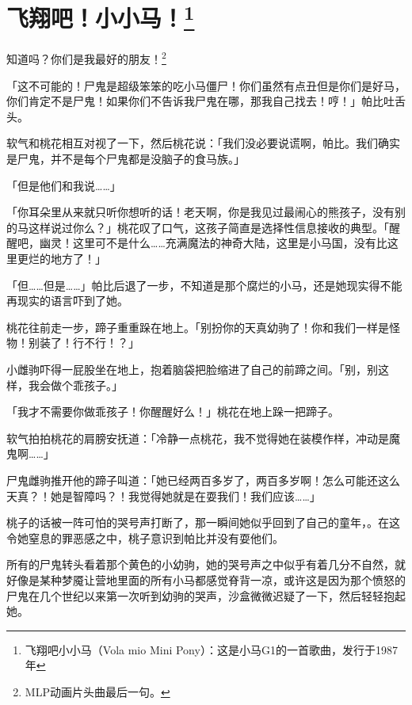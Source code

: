 \chapter[飞翔吧！小小马！]{\texorpdfstring{飞翔吧！小小马！\footnotespacefix\footnote{飞翔吧小小马（Vola mio Mini Pony）：这是小马G1的一首歌曲，发行于1987年}}{飞翔吧！小小马！}}



\begin{intro}
知道吗？你们是我最好的朋友！\footnotespacefix\footnote{MLP动画片头曲最后一句。}
\end{intro}


「这不可能的！尸鬼是超级笨笨的吃小马僵尸！你们虽然有点丑但是你们是好马，你们肯定不是尸鬼！如果你们不告诉我尸鬼在哪，那我自己找去！哼！」帕比吐舌头。

软气和桃花相互对视了一下，然后桃花说：「我们没必要说谎啊，帕比。我们确实是尸鬼，并不是每个尸鬼都是没脑子的食马族。」

「但是他们和我说……」

「你耳朵里从来就只听你想听的话！老天啊，你是我见过最闹心的熊孩子，没有别的马这样说过你么？」桃花叹了口气，这孩子简直是选择性信息接收的典型。「醒醒吧，幽灵！这里可不是什么……充满魔法的神奇大陆，这里是小马国，没有比这里更烂的地方了！」

「但……但是……」帕比后退了一步，不知道是那个腐烂的小马，还是她现实得不能再现实的语言吓到了她。

桃花往前走一步，蹄子重重跺在地上。「别扮你的天真幼驹了！你和我们一样是怪物！别装了！行不行！？」

小雌驹吓得一屁股坐在地上，抱着脑袋把脸缩进了自己的前蹄之间。「别，别这样，我会做个乖孩子。」

「我才不需要你做乖孩子！你醒醒好么！」桃花在地上跺一把蹄子。

软气拍拍桃花的肩膀安抚道：「冷静一点桃花，我不觉得她在装模作样，冲动是魔鬼啊……」

尸鬼雌驹推开他的蹄子叫道：「她已经两百多岁了，两百多岁啊！怎么可能还这么天真？！她是智障吗？！我觉得她就是在耍我们！我们应该……」

桃子的话被一阵可怕的哭号声打断了，那一瞬间她似乎回到了自己的童年，。在这令她窒息的罪恶感之中，桃子意识到帕比并没有耍他们。

所有的尸鬼转头看着那个黄色的小幼驹，她的哭号声之中似乎有着几分不自然，就好像是某种梦魇让营地里面的所有小马都感觉脊背一凉，或许这是因为那个愤怒的尸鬼在几个世纪以来第一次听到幼驹的哭声，沙盒微微迟疑了一下，然后轻轻抱起她。

